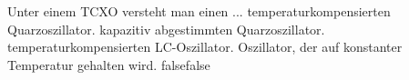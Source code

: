     {Unter einem TCXO versteht man einen ...}
    {temperaturkompensierten Quarzoszillator.}
    {kapazitiv abgestimmten Quarzoszillator.}
    {temperaturkompensierten LC-Oszillator.}
    {Oszillator, der auf konstanter Temperatur gehalten wird.}
    {false}{false}